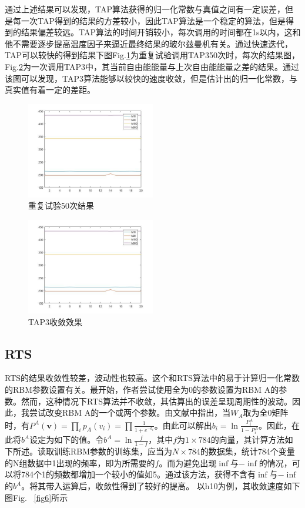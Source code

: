 \documentclass[journal,a4paper]{IEEEtran}
\begin{document}
		通过上述结果可以发现，TAP算法获得的归一化常数与真值之间有一定误差，但是每一次TAP得到的结果的方差较小，因此TAP算法是一个稳定的算法，但是得到的结果偏差较远。TAP算法的时间开销较小，每次调用的时间都在1s以内，这和他不需要逐步提高温度因子来逼近最终结果的玻尔兹曼机有关。通过快速迭代，TAP可以较快的得到结果下图Fig.\ref{fig4}为重复试验调用TAP350次时，每次的结果图，Fig.\ref{fig5}为一次调用TAP3中，其当前自由能能量与上次自由能能量之差的结果。通过该图可以发现，TAP3算法能够以较快的速度收敛，但是估计出的归一化常数，与真实值有着一定的差距。
		\begin{figure}[h]
			\includegraphics[width=0.5\textwidth]{4.jpg}
			\caption{重复试验50次结果}
			\label{fig4}
		\end{figure}
		\begin{figure}[h]
			\includegraphics[width=0.5\textwidth]{4.jpg}
			\caption{TAP3收敛效果}
			\label{fig5}
		\end{figure}
	
	\subsection{RTS}
		RTS的结果收敛性较差，波动性也较高。这个和RTS算法中的易于计算归一化常数的RBM参数设置有关。最开始，作者尝试使用全为0的参数设置为RBM A的参数。然而，这种情况下RTS算法并不收敛，其估算出的误差呈现周期性的波动。因此，我尝试改变RBM A的一个或两个参数。由文献\cite{salakhutdinov2009learning}中指出，当$W_A$取为全0矩阵时，有$P^A(\mathbf{v})=\prod_ip_A(v_i)=\prod\frac{1}{1+e^{-b_i}}$。由此可以解出$b_i = \ln \frac{P_i^A}{1-P_i^A}$。因此，在此将$b^A$设定为如下的值。令$b^A=\ln \frac{f}{1-f}$，其中$f$为$1\times784$的向量，其计算方法如下所述。读取训练RBM参数的训练集，应当为$N\times784$的数据集，统计784个变量的N组数据中1出现的频率，即为所需要的$f$。而为避免出现$\inf$与$-\inf$的情况，可以将784个1的频数都增加一个较小的值如5。通过该方法，获得不含有$\inf$与$-\inf$的$b^A$。将其带入运算后，收敛性得到了较好的提高。
		以h10为例，其收敛速度如下图Fig. ~\ref{fig6}所示
		
\end{document}
